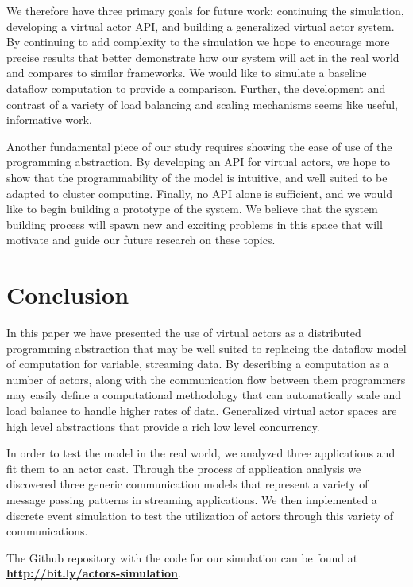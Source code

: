 \documentclass[conference,twocolumn,10pt]{IEEEtran}
\newcommand{\bennote}[1]{\textcolor{magenta}{\bf #1}}
\begin{document}
We therefore have three primary goals for future work: continuing the simulation, developing a virtual actor API, and building a generalized virtual actor system. By continuing to add complexity to the simulation we hope to encourage more precise results that better demonstrate how our system will act in the real world and compares to similar frameworks. We would like to simulate a baseline dataflow computation to provide a comparison. Further, the development and contrast of a variety of load balancing and scaling mechanisms seems like useful, informative work.

Another fundamental piece of our study requires showing the ease of use of the programming abstraction. By developing an API for virtual actors, we hope to show that the programmability of the model is intuitive, and well suited to be adapted to cluster computing. Finally, no API alone is sufficient, and we would like to begin building a prototype of the system. We believe that the system building process will spawn new and exciting problems in this space that will motivate and guide our future research on these topics.

\section{Conclusion}

In this paper we have presented the use of virtual actors as a distributed programming abstraction that may be well suited to replacing the dataflow model of computation for variable, streaming data. By describing a computation as a number of actors, along with the communication flow between them programmers may easily define a computational methodology that can automatically scale and load balance to handle higher rates of data. Generalized virtual actor spaces are high level abstractions that provide a rich low level concurrency.

In order to test the model in the real world, we analyzed three applications and fit them to an actor cast. Through the process of application analysis we discovered three generic communication models that represent a variety of message passing patterns in streaming applications. We then implemented a discrete event simulation to test the utilization of actors through this variety of communications.


The Github repository with the code for our simulation can be found at \bennote{\url{http://bit.ly/actors-simulation}}.
\end{document}
